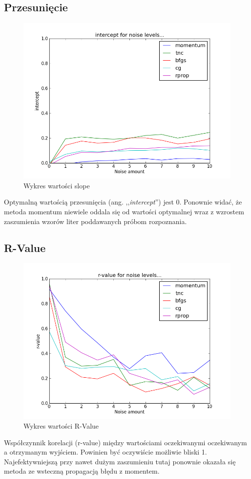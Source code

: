 \documentclass[a4paper]{article}
\begin{document}
\subsection{Przesunięcie}
\begin{figure}[pht]
 \centering
 \includegraphics[scale=0.5]{../compare_plots/compare_plot_intercept}
 \caption{Wykres wartości slope}\label{rys:plot1}
\end{figure}
Optymalną wartością przesunięcia (ang. ,,\textit{intercept}'') jest 0. Ponownie widać, że metoda momentum niewiele oddala się od
wartości optymalnej wraz z wzrostem zaszumienia wzorów liter poddawanych próbom rozpoznania.

\newpage
\subsection{R-Value}
\begin{figure}[pht]
 \centering
 \includegraphics[scale=0.5]{../compare_plots/compare_plot_r_value}
 \caption{Wykres wartości R-Value}\label{rys:plot1}
\end{figure}
Współczynnik korelacji (r-value) między wartościami oczekiwanymi oczekiwanym a otrzymanym wyjściem.
Powinien być oczywiście możliwie bliski 1. 
Najefektywniejszą przy nawet dużym zaszumieniu tutaj ponownie okazała się metoda ze wsteczną propagacją błędu z momentem.
\end{document}
